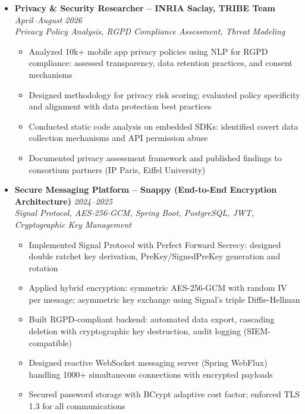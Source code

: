 \documentclass[a4paper,11pt]{article}
\begin{document}
\begin{itemize}[leftmargin=*, label={-}]

\item \textbf{Privacy \& Security Researcher -- INRIA Saclay, TRIBE Team} \hfill \textit{April--August 2026} \\
\textit{Privacy Policy Analysis, RGPD Compliance Assessment, Threat Modeling} \vspace{-2pt}
    \begin{itemize}[leftmargin=0.4cm, nosep, label=\tiny$\bullet$]
        \item Analyzed 10k+ mobile app privacy policies using NLP for RGPD compliance: assessed transparency, data retention practices, and consent mechanisms
        \item Designed methodology for privacy risk scoring; evaluated policy specificity and alignment with data protection best practices
        \item Conducted static code analysis on embedded SDKs: identified covert data collection mechanisms and API permission abuse
        \item Documented privacy assessment framework and published findings to consortium partners (IP Paris, Eiffel University)
    \end{itemize}

\item \textbf{Secure Messaging Platform -- Snappy (End-to-End Encryption Architecture)} \hfill \textit{2024--2025} \\
\textit{Signal Protocol, AES-256-GCM, Spring Boot, PostgreSQL, JWT, Cryptographic Key Management} \vspace{-2pt}
    \begin{itemize}[leftmargin=0.4cm, nosep, label=\tiny$\bullet$]
        \item Implemented Signal Protocol with Perfect Forward Secrecy: designed double ratchet key derivation, PreKey/SignedPreKey generation and rotation
        \item Applied hybrid encryption: symmetric AES-256-GCM with random IV per message; asymmetric key exchange using Signal's triple Diffie-Hellman
        \item Built RGPD-compliant backend: automated data export, cascading deletion with cryptographic key destruction, audit logging (SIEM-compatible)
        \item Designed reactive WebSocket messaging server (Spring WebFlux) handling 1000+ simultaneous connections with encrypted payloads
        \item Secured password storage with BCrypt adaptive cost factor; enforced TLS 1.3 for all communications
    \end{itemize}


\end{itemize}
\end{document}
